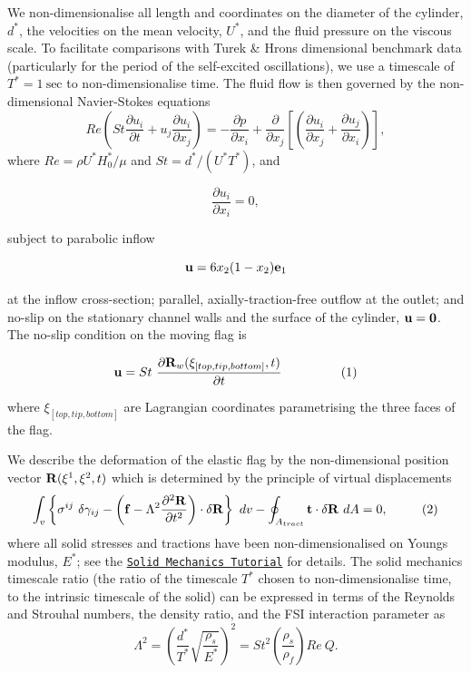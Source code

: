 We non-\/dimensionalise all length and coordinates on the diameter of the cylinder, $ d^* $, the velocities on the mean velocity, $ U^* $, and the fluid pressure on the viscous scale. To facilitate comparisons with Turek \& Hron\textquotesingle{}s dimensional benchmark data (particularly for the period of the self-\/excited oscillations), we use a timescale of $ T^* = 1 \ \mbox{sec} $ to non-\/dimensionalise time. The fluid flow is then governed by the non-\/dimensional Navier-\/\+Stokes equations \[ Re \left( St \frac{\partial u_i}{\partial t} + u_j \frac{\partial u_i}{\partial x_j} \right) = - \frac{\partial p}{\partial x_i} + \frac{\partial }{\partial x_j} \left[ \left( \frac{\partial u_i}{\partial x_j} + \frac{\partial u_j}{\partial x_i} \right) \right], \] where $ Re = \rho U^* H_0^* / \mu $ and $ St = d^* / (U^* T^*) $, and \begin{center} \[ \frac{\partial u_i}{\partial x_i} = 0, \] \end{center}  subject to parabolic inflow \begin{center} \[ {\bf u} = 6 x_2 (1-x_2) {\bf e}_1 \] \end{center}  at the inflow cross-\/section; parallel, axially-\/traction-\/free outflow at the outlet; and no-\/slip on the stationary channel walls and the surface of the cylinder, $ {\bf u} = {\bf 0} $. The no-\/slip condition on the moving flag is \begin{center} \[ {\bf u} = St \ \frac{\partial {\bf R}_w(\xi_{[top,tip,bottom]},t)}{\partial t} \ \ \ \ \ \ \ \ \ \ \ \ \ \ (1) \] \end{center}  where $ \xi_{[top,tip,bottom]} $ are Lagrangian coordinates parametrising the three faces of the flag.

We describe the deformation of the elastic flag by the non-\/dimensional position vector $ {\bf R}(\xi^1, \xi^2, t) $ which is determined by the principle of virtual displacements \[ \int_{v} \left\{ \sigma^{ij} \ \delta \gamma_{ij} - \left( {\bf f} - \Lambda^2 \frac{\partial^2 {\bf R}}{\partial t^{2}} \right) \cdot \delta {\bf R} \right\} \ dv -\oint_{A_{tract}} {\bf t} \cdot \delta {\bf R} \ dA =0, \ \ \ \ \ \ \ \ (2) \] where all solid stresses and tractions have been non-\/dimensionalised on Young\textquotesingle{}s modulus, $ E^* $; see the \href{../../../solid/solid_theory/html/index.html}{\tt Solid Mechanics Tutorial} for details. The solid mechanics timescale ratio (the ratio of the timescale $ T^* $ chosen to non-\/dimensionalise time, to the intrinsic timescale of the solid) can be expressed in terms of the Reynolds and Strouhal numbers, the density ratio, and the F\+SI interaction parameter as \[ \Lambda^2 = \left( \frac{d^*}{T^*} \sqrt{\frac{\rho_s}{E^*}} \right)^2 = St^2 \left( \frac{\rho_s}{\rho_f} \right) Re \ Q. \]


